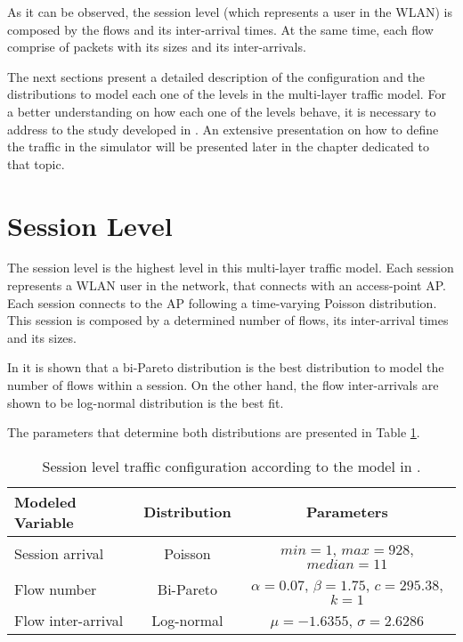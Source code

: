 As it can be observed, the session level (which represents a user in the \acs{WLAN}) is composed by the flows and its inter-arrival times. At the same time, each flow comprise of packets with its sizes and its inter-arrivals.

The next sections present a detailed description of the configuration and the distributions to model each one of the levels in the multi-layer traffic model. For a better understanding on how each one of the levels behave, it is necessary to address to the study developed in \cite{Campus-WLAN}. An extensive presentation on how to define the traffic in the simulator will be presented later in the chapter dedicated to that topic.

\section{Session Level} \label{sec:session_level}
The session level is the highest level in this multi-layer traffic model. Each session represents a \acs{WLAN} user in the network, that connects with an access-point \acs{AP}. Each session connects to the \acs{AP} following a time-varying Poisson distribution. This session is composed by a determined number of flows, its inter-arrival times and its sizes.

In \cite{Campus-WLAN} it is shown that a bi-Pareto distribution is the best distribution to model the number of flows within a session. On the other hand, the flow inter-arrivals are shown to be log-normal distribution is the best fit. 

The parameters that determine both distributions are presented in Table \ref{table:session_traffic}.

\begin{table}[h!]
	\begin{center}
		\begin{tabular}{ l | c | c }
			Modeled Variable & Distribution & Parameters \\ \hline
			Session arrival & Poisson & $min = 1$, $max = 928$, $median = 11$\\
			Flow number & Bi-Pareto & $\alpha = 0.07$, $\beta = 1.75$, $c = 295.38$, $k = 1$\\
			Flow inter-arrival & Log-normal & $\mu = -1.6355$, $\sigma = 2.6286$\\
		\end{tabular}
		\caption{Session level traffic configuration according to the model in \cite{Campus-WLAN}.}
		\label{table:session_traffic}
	\end{center}
\end{table}

